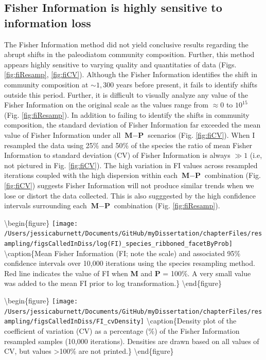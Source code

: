 \documentclass[12pt,twoside,openany]{reedthesis}
\begin{document}
\hypertarget{fisher-information-is-highly-sensitive-to-information-loss}{%
\subsection{Fisher Information is highly sensitive to information loss}\label{fisher-information-is-highly-sensitive-to-information-loss}}

The Fisher Information method did not yield conclusive results regarding the abrupt shifts in the paleodiatom community composition. Further, this method appears highly sensitive to varying quality and quantitaties of data (Figs. \ref{fig:fiResamp}, \ref{fig:fiCV}). Although the Fisher Information identifies the shift in community composition at \(\sim1,300\) years before present, it fails to identify shifts outside this period. Further, it is difficult to visually analyze any value of the Fisher Information on the original scale as the values range from \(\approx 0\) to \(10^15\) (Fig. \ref{fig:fiResamp}). In addition to failing to identify the shifts in community composition, the standard deviation of Fisher Information far exceeded the mean value of Fisher Information under all \(\textbf{M}-\textbf{P}\) scenarios (Fig. \ref{fig:fiCV}). When I resampled the data using 25\% and 50\% of the species the ratio of mean Fisher Information to standard deviation (CV) of Fisher Information is always \(\gg 1\) (i.e, not pictured in Fig. \ref{fig:fiCV}). The high variation in FI values across resampled iterations coupled with the high dispersion within each \(\textbf{M}-\textbf{P}\) combination (Fig. \ref{fig:fiCV}) suggests Fisher Information will not produce similar trends when we lose or distort the data collected. This is also sugggested by the high confidence intervals surrounding each \(\textbf{M}-\textbf{P}\) combination (Fig. \ref{fig:fiResamp}).

\textbackslash begin\{figure\}
\texttt{[image: /Users/jessicaburnett/Documents/GitHub/myDissertation/chapterFiles/resampling/figsCalledInDiss/log(FI)\_species\_ribboned\_facetByProb]} \textbackslash caption\{Mean Fisher Information (FI; note the scale) and associated 95\% confidence intervals over 10,000 iterations using the species resampling method. Red line indicates the value of FI when \textbf{M} and \textbf{P} = 100\%. A very small value was added to the mean FI prior to log transformation.\}\label{fig:fiResamp}
\textbackslash end\{figure\}

\textbackslash begin\{figure\}
\texttt{[image: /Users/jessicaburnett/Documents/GitHub/myDissertation/chapterFiles/resampling/figsCalledInDiss/FI\_cvDensity]} \textbackslash caption\{Density plot of the coefficient of variation (CV) as a percentage (\%) of the Fisher Information resampled samples (10,000 iterations). Densities are drawn based on all values of CV, but values \textgreater100\% are not printed.\}\label{fig:fiCV}
\textbackslash end\{figure\}
\end{document}
